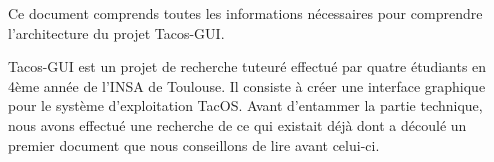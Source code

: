 Ce document comprends toutes les informations nécessaires pour comprendre l'architecture du projet Tacos-GUI.

Tacos-GUI est un projet de recherche tuteuré effectué par quatre étudiants en 4ème année de l'INSA de Toulouse.
Il consiste à créer une interface graphique pour le système d'exploitation TacOS.
Avant d'entammer la partie technique, nous avons effectué une recherche de ce qui existait déjà dont a découlé un premier document que nous conseillons de lire avant celui-ci.